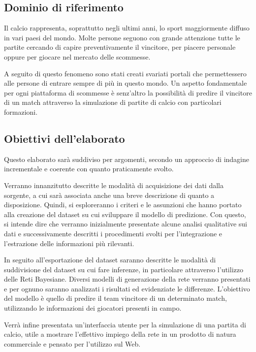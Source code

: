 \documentclass[hidelinks, 12pt]{article}
\begin{document}
\subsection{Dominio di riferimento}

Il calcio rappresenta, soprattutto negli ultimi anni, lo sport maggiormente diffuso in vari paesi del mondo. Molte persone seguono con grande attenzione tutte le partite cercando di capire preventivamente il vincitore, per piacere personale oppure per giocare nel mercato delle scommesse.

A seguito di questo fenomeno sono stati creati svariati portali che permettessero alle persone di entrare sempre di più in questo mondo. Un aspetto fondamentale per ogni piattaforma di scommesse è senz'altro la possibilità di predire il vincitore di un match attraverso la simulazione di partite di calcio con particolari formazioni.



\subsection{Obiettivi dell'elaborato}

Questo elaborato sarà suddiviso per argomenti, secondo un approccio di indagine incrementale e coerente con quanto praticamente svolto.

Verranno innanzitutto descritte le modalità di acquisizione dei dati dalla sorgente, a cui sarà associata anche una breve descrizione di quanto a disposizione. Quindi, si esploreranno i criteri e le assunzioni che hanno portato alla creazione del dataset su cui sviluppare il modello di predizione. Con questo, si intende dire che verranno inizialmente presentate alcune analisi qualitative sui dati e successivamente descritti i procedimenti svolti per l'integrazione e l'estrazione delle informazioni più rilevanti.

In seguito all'esportazione del dataset saranno descritte le modalità di suddivisione del dataset su cui fare inferenze, in particolare attraverso l'utilizzo delle Reti Bayesiane. Diversi modelli di generazione della rete verranno presentati e per ognuno saranno analizzati i risultati ed evidenziate le differenze. L'obiettivo del modello è quello di predire il team vincitore di un determinato match, utilizzando le informazioni dei giocatori presenti in campo.

Verrà infine presentata un'interfaccia utente per la simulazione di una partita di calcio, utile a mostrare l'effettivo impiego della rete in un prodotto di natura commerciale e pensato per l'utilizzo sul Web.
\end{document}
